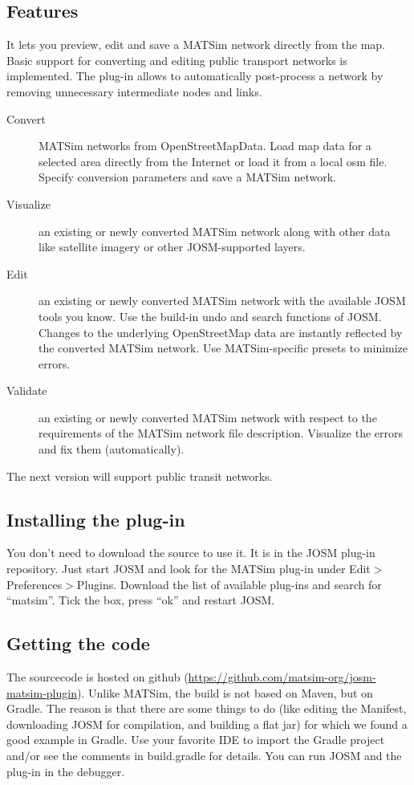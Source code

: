 \subsection{Features}
It lets you preview, edit and save a MATSim network directly from the map. Basic support for converting and editing public transport networks is implemented. The plug-in allows to automatically post-process a network by removing unnecessary intermediate nodes and links.
\begin{description}
\item[Convert] MATSim networks from OpenStreetMapData. Load map data for a selected area directly from the Internet or load it from a local osm file. Specify conversion parameters and save a MATSim network.
\item[Visualize] an existing or newly converted MATSim network along with other data like satellite imagery or other JOSM-supported layers.
\item[Edit] an existing or newly converted MATSim network with the available JOSM tools you know. Use the build-in undo and search functions of JOSM. Changes to the underlying OpenStreetMap data are instantly reflected by the converted MATSim network. Use MATSim-specific presets to minimize errors.
\item[Validate] an existing or newly converted MATSim network with respect to the requirements of the MATSim network file description. Visualize the errors and fix them (automatically). 
\end{description}
The next version will support public transit networks.

\subsection{Installing the plug-in}
You don't need to download the source to use it. It is in the JOSM plug-in repository. Just start JOSM and look for the MATSim plug-in under Edit$>$Preferences$>$Plugins. Download the list of available plug-ins and search for ``matsim''. Tick the box, press ``ok'' and restart JOSM.

\subsection{Getting the code}
The sourcecode is hosted on github (\url{https://github.com/matsim-org/josm-matsim-plugin}). Unlike MATSim, the build is not based on Maven, but on Gradle. The reason is that there are some things to do (like editing the Manifest, downloading JOSM for compilation, and building a flat jar) for which we found a good example in Gradle. Use your favorite IDE to import the Gradle project and/or see the comments in build.gradle for details. You can run JOSM and the plug-in in the debugger.
 
